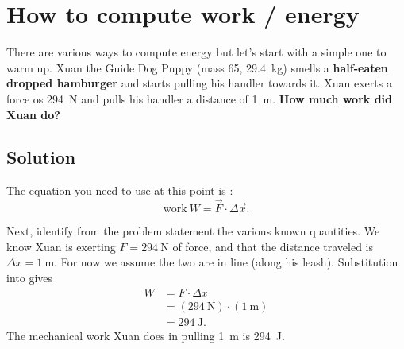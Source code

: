 \documentclass[handout]{tufte-handout}
\begin{document}
\vfill
\section{How to compute work / energy}
There are various ways to compute energy but let's start with a simple one to warm up. Xuan the Guide Dog Puppy (mass \SI{65}{\pound}, \SI{29.4}{\kilo\gram}) smells a \textbf{half-eaten dropped hamburger} and starts pulling his handler towards it. Xuan exerts a force os \SI{294}{\newton} and pulls his handler a distance of \SI{1}{\meter}. \textbf{How much work did Xuan do?}

\subsection{Solution}
The equation you need to use at this point is : 
\begin{equation}
\text{work}\ W = \vec{F}\cdot\Delta\vec{x}.
\label{eq:worksoln1}
\end{equation}

Next, identify from the problem statement the various known quantities. We know Xuan is exerting $F=\SI{294}{\newton}$ of force, and that the distance traveled is $\Delta x=\SI{1}{\meter}$. For now we assume the two are in line (along his leash).  Substitution into  gives
\begin{align}
W &= F\cdot \Delta x \\
&= (\SI{294}{\newton})\cdot(\SI{1}{\meter}) \\
&= \SI{294}{\joule}.
\end{align}
The mechanical work Xuan does in pulling \SI{1}{\meter} is \SI{294}{\joule}.




\clearpage
\end{document}
